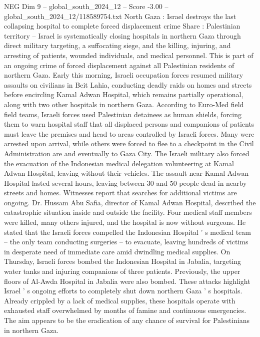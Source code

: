 \begin{textsample}{NEG Dim 9 – global\_south\_2024\_12 – Score -3.00 – global\_south\_2024\_12/118589754.txt}  \label{ex:f9_neg_135}
North Gaza : Israel destroys the last collapsing hospital to complete forced displacement crime Share : Palestinian territory -- Israel is systematically closing hospitals in northern Gaza through direct military targeting, a suffocating siege, and the killing, injuring, and arresting of patients, wounded individuals, and medical personnel.
This is part of an ongoing crime of forced displacement against all Palestinian residents of northern Gaza.
Early this morning, Israeli occupation forces resumed military assaults on civilians in Beit Lahia, conducting deadly raids on homes and streets before encircling Kamal Adwan Hospital, which remains partially operational, along with two other hospitals in northern Gaza.
According to Euro-Med field field teams, Israeli forces used Palestinian detainees as human shields, forcing them to warn hospital staff that all displaced persons and companions of patients must leave the premises and head to areas controlled by Israeli forces.
Many were arrested upon arrival, while others were forced to flee to a checkpoint in the Civil Administration are and eventually to Gaza City.
The Israeli military also forced the evacuation of the Indonesian medical delegation volunteering at Kamal Adwan Hospital, leaving without their vehicles.
The assault near Kamal Adwan Hospital lasted several hours, leaving between 30 and 50 people dead in nearby streets and homes.
Witnesses report that searches for additional victims are ongoing.
Dr.
Hussam Abu Safia, director of Kamal Adwan Hospital, described the catastrophic situation inside and outside the facility.
Four medical staff members were killed, many others injured, and the hospital is now without surgeons.
He stated that the Israeli forces compelled the Indonesian Hospital ' s medical team -- the only team conducting surgeries -- to evacuate, leaving hundreds of victims in desperate need of immediate care amid dwindling medical supplies.
On Thursday, Israeli forces bombed the Indonesian Hospital in Jabalia, targeting water tanks and injuring companions of three patients.
Previously, the upper floors of Al-Awda Hospital in Jabalia were also bombed.
These attacks highlight Israel ' s ongoing efforts to completely shut down northern Gaza ' s hospitals.
Already crippled by a lack of medical supplies, these hospitals operate with exhausted staff overwhelmed by months of famine and continuous emergencies.
The aim appears to be the eradication of any chance of survival for Palestinians in northern Gaza.

\end{textsample}

